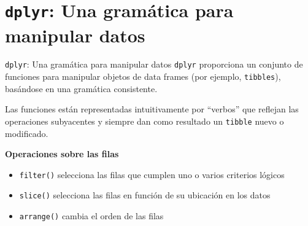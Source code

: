 \documentclass[
  ignorenonframetext,
  aspectratio=169]{beamer}
\begin{document}
\hypertarget{dplyr-una-gramuxe1tica-para-manipular-datos}{%
\section{\texorpdfstring{\texttt{dplyr}: Una gramática para manipular
datos}{dplyr: Una gramática para manipular datos}}\label{dplyr-una-gramuxe1tica-para-manipular-datos}}

\begin{frame}[fragile]{\texttt{dplyr}: Una gramática para manipular
datos}
\protect\hypertarget{dplyr-una-gramuxe1tica-para-manipular-datos-1}{}
\texttt{dplyr} proporciona un conjunto de funciones para manipular
objetos de data frames (por ejemplo, \texttt{tibbles}), basándose en una
gramática consistente.

Las funciones están representadas intuitivamente por ``verbos'' que
reflejan las operaciones subyacentes y siempre dan como resultado un
\texttt{tibble} nuevo o modificado.

\textbf{Operaciones sobre las filas}

\begin{itemize}
\item
  \texttt{filter()} selecciona las filas que cumplen uno o varios
  criterios lógicos
\item
  \texttt{slice()} selecciona las filas en función de su ubicación en
  los datos
\item
  \texttt{arrange()} cambia el orden de las filas
\end{itemize}
\end{frame}
\end{document}
